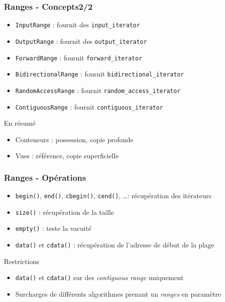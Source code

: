 \documentclass[C++.tex]{subfiles}
\begin{document}
\begin{frame}[fragile]
	\frametitle{Ranges - Concepts\titlehfill{}2/2}
	\begin{itemize}
		\item \lstinline|InputRange| : fournit des \lstinline|input_iterator|
		\item \lstinline|OutputRange| : fournit des \lstinline|output_iterator|
		\item \lstinline|ForwardRange| : fournit \lstinline|forward_iterator|
		\item \lstinline|BidirectionalRange| : fournit \lstinline|bidirectional_iterator|
		\item \lstinline|RandomAccessRange| : fournit \lstinline|random_access_iterator|
		\item \lstinline|ContiguousRange| : fournit \lstinline|contiguous_iterator|
	\end{itemize}

	\pause

	\begin{block}{En résumé}
		\begin{itemize}
			\item Conteneurs : possession, copie profonde
			\item Vues : référence, copie superficielle
		\end{itemize}
	\end{block}

\end{frame}

\begin{frame}
	\frametitle{Ranges - Opérations}
	\begin{itemize}
		\item \lstinline|begin()|, \lstinline|end()|, \lstinline|cbegin()|, \lstinline|cend()|, \ldots : récupération des itérateurs


		\item \lstinline|size()| : récupération de la taille
		\item \lstinline|empty()| : teste la vacuité
		\item \lstinline|data()| et \lstinline|cdata()| : récupération de l'adresse de début de la plage
	\end{itemize}

	\begin{alertblock}{Restrictions}
		\begin{itemize}
			\item \lstinline|data()| et \lstinline|cdata()| sur des \textit{contiguous range} uniquement
		\end{itemize}
	\end{alertblock}

	\begin{itemize}
		\item Surcharges de différents algorithmes prenant un \textit{ranges} en paramètre
	\end{itemize}
\end{frame}
\end{document}
